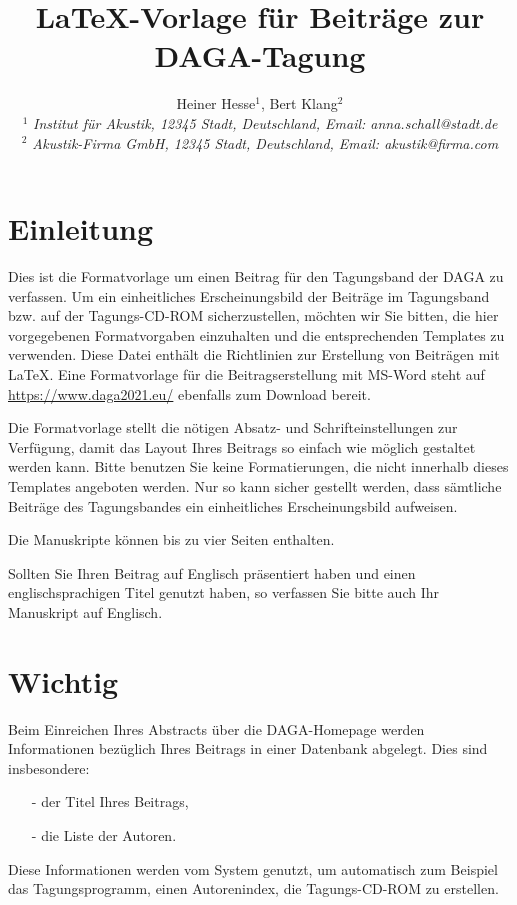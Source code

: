 \documentclass[a4paper, 10pt, twocolumn]{article}
\begin{document}
\date{}                                         %

\title{\vspace{-8mm}\textbf{\large
\LaTeX-Vorlage für Beiträge zur DAGA-Tagung }}

\author{
Heiner Hesse$^1$, Bert Klang$^2$\\
$^1$ \emph{\small Institut für Akustik, 12345 Stadt,
Deutschland, Email: anna.schall@stadt.de
}\\
$^2$ \emph{\small Akustik-Firma GmbH, 12345 Stadt, Deutschland,
Email: akustik@firma.com } } \maketitle
\thispagestyle{empty}           %
\section*{Einleitung}
\label{sec:Einleitung} Dies ist die Formatvorlage um einen Beitrag
für den Tagungsband der DAGA zu verfassen. Um ein einheitliches
Erscheinungsbild der Beiträge im Tagungsband bzw. auf der
Tagungs-CD-ROM sicherzustellen, möchten wir Sie bitten, die hier
vorgegebenen Formatvorgaben einzuhalten und die entsprechenden
Templates zu verwenden. Diese Datei enthält die Richtlinien zur
Erstellung von Beiträgen mit \LaTeX. Eine Formatvorlage für die
Beitragserstellung mit MS-Word steht auf
\url{https://www.daga2021.eu/} ebenfalls zum Download
bereit.

Die Formatvorlage stellt die nötigen Absatz- und Schrift\-einstellungen zur Verfügung, damit das Layout Ihres Beitrags so einfach wie möglich gestaltet werden kann. Bitte benutzen Sie keine Formatierungen, die nicht innerhalb dieses Templates angeboten werden. Nur so kann sicher gestellt werden, dass sämtliche Beiträge des Tagungsbandes ein einheitliches Erscheinungsbild aufweisen.

Die Manuskripte können bis zu vier Seiten enthalten.
 
Sollten Sie Ihren Beitrag auf Englisch präsentiert haben und einen englischsprachigen Titel genutzt haben, so verfassen Sie bitte auch Ihr Manuskript auf Englisch.


\section*{Wichtig}
\label{sec:Wichtig} Beim Einreichen Ihres Abstracts über die
DAGA-Homepage werden Informationen bezüglich Ihres Beitrags in
einer Datenbank abgelegt. Dies sind insbesondere:
\begin{itemize}
    \item[-] der Titel Ihres Beitrags,
    \item[-] die Liste der Autoren.
\end{itemize}
Diese Informationen werden vom System genutzt, um automatisch zum Beispiel das Tagungsprogramm, einen Autorenindex, die Tagungs-CD-ROM zu erstellen.
\end{document}
